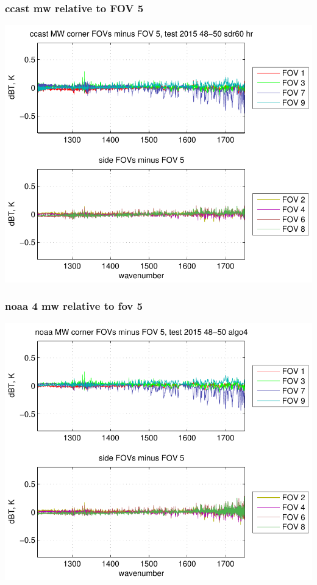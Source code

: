 \documentclass[11pt]{beamer}
\begin{document}
\begin{frame}
\frametitle{ccast mw relative to FOV 5}
\begin{center}
  \includegraphics[scale=0.7]{figures/ccast_MW_dif_2015_48-50_sdr60_hr.pdf}
\end{center}
\end{frame}
\begin{frame}
\frametitle{noaa 4 mw relative to fov 5}
\begin{center}
  \includegraphics[scale=0.7]{figures/noaa_MW_dif_2015_48-50_algo4.pdf}
\end{center}
\end{frame}
\end{document}
